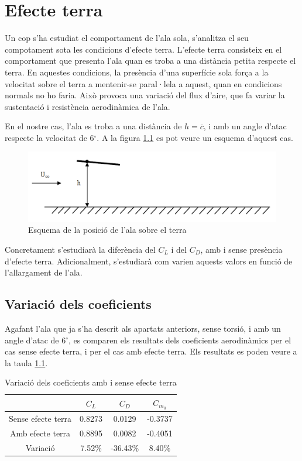 \chapter{Efecte terra}
Un cop s'ha estudiat el comportament de l'ala sola, s'analitza el seu compotament sota les condicions d'efecte terra. L'efecte terra consisteix en el comportament que presenta l'ala quan es troba a una distància petita respecte el terra. En aquestes condicions, la presència d'una superfície sola força a la velocitat sobre el terra a mentenir-se paral·lela a aquest, quan en condicions normals no ho faria. Això provoca una variació del flux d'aire, que fa variar la sustentació i resistència aerodinàmica de l'ala.

En el nostre cas, l'ala es troba a una distància de $h=\bar{c}$, i amb un angle d'atac respecte la velocitat de 6$^{\circ}$. A la figura \ref{GroundEffect} es pot veure un esquema d'aquest cas.

\begin{figure}[H]
	\centering
	\includegraphics[scale=0.5]{./plots/GroundEffectWing.png}
	\caption{Esquema de la posició de l'ala sobre el terra}
	\label{GroundEffect}
\end{figure}

Concretament s'estudiarà la diferència del $C_{L}$ i del $C_{D}$, amb i sense presència d'efecte terra. Adicionalment, s'estudiarà com varien aquests valors en funció de l'allargament de l'ala.

\section{Variació dels coeficients}

Agafant l'ala que ja s'ha descrit als apartats anteriors, sense torsió, i amb un angle d'atac de 6$^{\circ}$, es comparen els resultats dels coeficients aerodinàmics per el cas sense efecte terra, i per el cas amb efecte terra. Els resultats es poden veure a la taula \ref{NoGroundvsGround}.

\begin{table} [H]
	\centering
	\begin{tabular}{| c | c | c | c |}	
		\hline
		& $C_{L}$ & $C_{D}$ & $C_{m_{0}}$ \\
		\hline
		Sense efecte terra & 0.8273 & 0.0129 & -0.3737 \\
		\hline
		Amb efecte terra & 0.8895 & 0.0082 & -0.4051 \\
		\hline	
		Variació & 7.52\% & -36.43\% & 8.40\% \\
		\hline
	\end{tabular}
\caption{Variació dels coeficients amb i sense efecte terra} \label{NoGroundvsGround}
\end{table}

